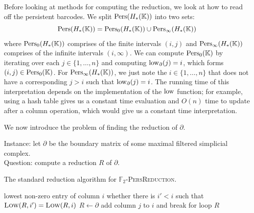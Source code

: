 Before looking at methods for computing the reduction, we look at how to read off the persistent barcodes. We split $\operatorname{Pers}(H_*(\mathbb K))$ into two sets:
\[ \operatorname{Pers}(H_*(\mathbb K)) = \operatorname{Pers}_0(H_*(\mathbb K)) \cup \operatorname{Pers}_\infty(H_*(\mathbb K))\]
where $\operatorname{Pers}_0(H_*(\mathbb K))$ comprises of the finite intervals $(i,j)$ and $\operatorname{Pers}_\infty(H_*(\mathbb K))$ comprises of the infinite intervals $(i, \infty)$. We can compute $\operatorname{Pers}_0(\mathbb K)$ by iterating over each $j \in \{1, \ldots, n\}$ and computing $\operatorname{low}_\partial(j) = i$, which forms $(i, j) \in \operatorname{Pers}_0(\mathbb K)$. For $\operatorname{Pers}_\infty(H_*(\mathbb K))$, we just note the $i \in \{1, \ldots, n\}$ that does not have a corresponding $j > i$ such that $\operatorname{low}_\partial(j) = i$. The running time of this interpretation depends on the implementation of the $\operatorname{low}$ function; for example, using a hash table gives us a constant time evaluation and $O(n)$ time to update after a column operation, which would give us a constant time interpretation. 

We now introduce the problem of finding the reduction of $\partial$. 

\begin{problem}
  Instance: let $\partial$ be the boundary matrix of some maximal filtered simplicial complex. \\
  Question: compute a reduction $R$ of $\partial$.
\end{problem}

\begin{algorithm}
  \caption{The standard reduction algorithm for \textsc{$\mathbb F_2$-\-Pers\-Reduc\-tion}.}
  \label{alg:std-reduction}
  \begin{algorithmic}[1]
        \State\Return lowest non-zero entry of column $i$
      \EndFunction
        \State\Return whether there is $i' < i$ such that $\Call{Low}{R, i'} = \Call{Low}{R, i}$
      \EndFunction
        \State $R \gets \partial$
                \State add column $j$ to $i$ and break for loop
              \EndIf
            \EndFor
          \EndWhile
        \EndFor
        \State\Return $R$
      \EndFunction
  \end{algorithmic}
\end{algorithm}

